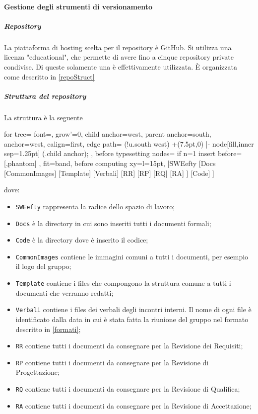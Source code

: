 		\paragraph{Gestione degli strumenti di versionamento}
			\subparagraph{Repository} \Spazio
			La piattaforma di hosting scelta per il repository è GitHub. Si utilizza una licenza "educational", che permette di avere fino a cinque repository private condivise. Di queste solamente una è effettivamente utilizzata. È organizzata come descritto in \ref{repoStruct}
			\subparagraph{Struttura del repository}\Spazio
			\label{repoStruct}
			La struttura è la seguente\\
			\begin{center}
			\begin{forest}
				for tree={
					font=\ttfamily,
					grow'=0,
					child anchor=west,
					parent anchor=south,
					anchor=west,
					calign=first,
					edge path={
						\noexpand{}
						(!u.south west) +(7.5pt,0) |- node[fill,inner sep=1.25pt] {} (.child anchor);
					},
					before typesetting nodes={
						if n=1
						{insert before={[,phantom]}}
						{}
					},
					fit=band,
					before computing xy={l=15pt},
				}
				[SWEefty
					[Docs
						[CommonImages]
						[Template]
						[Verbali]
						[RR]
						[RP]
						[RQ]
						[RA]
					]
					[Code]
				]
			\end{forest}
			\end{center}
			dove:
			\begin{itemize}
				\item \texttt{SWEefty} rappresenta la radice dello spazio di lavoro;
				\item \texttt{Docs} è la directory in cui sono inseriti tutti i documenti formali;
				\item \texttt{Code} è la directory dove è inserito il codice;
				\item \texttt{CommonImages} contiene le immagini comuni a tutti i documenti, per esempio il logo del gruppo;
				\item \texttt{Template} contiene i files che compongono la struttura comune a tutti i documenti che verranno redatti;
				\item \texttt{Verbali} contiene i files dei verbali degli incontri interni. Il nome di ogni file è identificato dalla data in cui è stata fatta la riunione del gruppo nel formato descritto in \ref{formati};
				\item \texttt{RR} contiene tutti i documenti da consegnare per la Revisione dei Requisiti;
				\item \texttt{RP} contiene tutti i documenti da consegnare per la Revisione di Progettazione;
				\item \texttt{RQ} contiene tutti i documenti da consegnare per la Revisione di Qualifica;
				\item \texttt{RA} contiene tutti i documenti da consegnare per la Revisione di Accettazione;	
			\end{itemize}
			
